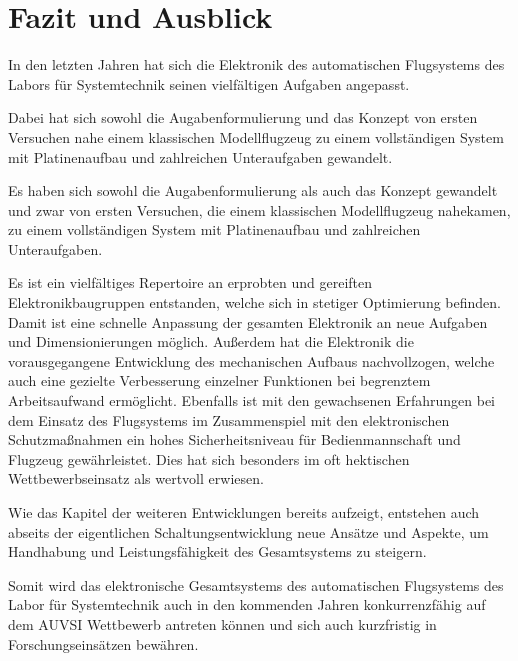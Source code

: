 \chapter{Fazit und Ausblick}\label{cha:Fazit und Ausblick}

In den letzten Jahren hat sich die Elektronik des automatischen Flugsystems des Labors für Systemtechnik seinen vielfältigen Aufgaben angepasst.

Dabei hat sich sowohl die Augabenformulierung und das Konzept von ersten Versuchen nahe einem klassischen Modellflugzeug zu einem vollständigen System mit Platinenaufbau und zahlreichen Unteraufgaben gewandelt.


Es haben sich sowohl die Augabenformulierung als auch das Konzept gewandelt und zwar von ersten Versuchen, die einem klassischen Modellflugzeug nahekamen, zu einem vollständigen System mit Platinenaufbau und zahlreichen Unteraufgaben.

Es ist ein vielfältiges Repertoire an erprobten und gereiften Elektronikbaugruppen entstanden, welche sich in stetiger Optimierung befinden. Damit ist eine schnelle Anpassung der gesamten Elektronik an neue Aufgaben und Dimensionierungen möglich.
Außerdem hat die Elektronik die vorausgegangene Entwicklung des mechanischen Aufbaus nachvollzogen, welche auch eine gezielte Verbesserung einzelner Funktionen bei begrenztem Arbeitsaufwand ermöglicht.
Ebenfalls ist mit den gewachsenen Erfahrungen bei dem Einsatz des Flugsystems im Zusammenspiel mit den elektronischen Schutzmaßnahmen ein hohes Sicherheitsniveau für Bedienmannschaft und Flugzeug gewährleistet. Dies hat sich besonders im oft hektischen Wettbewerbseinsatz als wertvoll erwiesen.

Wie das Kapitel der weiteren Entwicklungen bereits aufzeigt, entstehen auch abseits der eigentlichen Schaltungsentwicklung neue Ansätze und Aspekte, um Handhabung und Leistungsfähigkeit des Gesamtsystems zu steigern.

Somit wird das elektronische Gesamtsystems des automatischen Flugsystems des Labor für Systemtechnik auch in den kommenden Jahren konkurrenzfähig auf dem AUVSI Wettbewerb antreten können und sich auch kurzfristig in Forschungseinsätzen bewähren.

